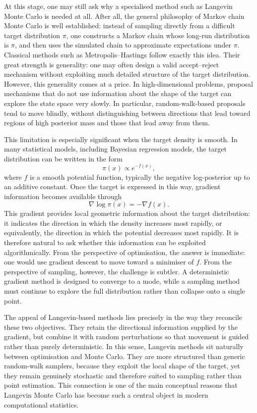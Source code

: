 \documentclass[a4paper,11pt, titlepage]{article}
\theoremstyle{definition}
\theoremstyle{plain}
\theoremstyle{remark}
\begin{document}
At this stage, one may still ask why a specialised method such as Langevin Monte Carlo is needed at all. After all, the general philosophy of Markov chain Monte Carlo is well established: instead of sampling directly from a difficult target distribution $\pi$, one constructs a Markov chain whose long-run distribution is $\pi$, and then uses the simulated chain to approximate expectations under $\pi$. Classical methods such as Metropolis--Hastings follow exactly this idea. Their great strength is generality: one may often design a valid accept--reject mechanism without exploiting much detailed structure of the target distribution. However, this generality comes at a price. In high-dimensional problems, proposal mechanisms that do not use information about the shape of the target can explore the state space very slowly. In particular, random-walk-based proposals tend to move blindly, without distinguishing between directions that lead toward regions of high posterior mass and those that lead away from them.

This limitation is especially significant when the target density is smooth. In many statistical models, including Bayesian regression models, the target distribution can be written in the form
\[
\pi(x) \propto e^{-f(x)},
\]
where $f$ is a smooth potential function, typically the negative log-posterior up to an additive constant. Once the target is expressed in this way, gradient information becomes available through
\[
\nabla \log \pi(x) = -\nabla f(x).
\]
This gradient provides local geometric information about the target distribution: it indicates the direction in which the density increases most rapidly, or equivalently, the direction in which the potential decreases most rapidly. It is therefore natural to ask whether this information can be exploited algorithmically. From the perspective of optimisation, the answer is immediate: one would use gradient descent to move toward a minimiser of $f$. From the perspective of sampling, however, the challenge is subtler. A deterministic gradient method is designed to converge to a mode, while a sampling method must continue to explore the full distribution rather than collapse onto a single point.

The appeal of Langevin-based methods lies precisely in the way they reconcile these two objectives. They retain the directional information supplied by the gradient, but combine it with random perturbations so that movement is guided rather than purely deterministic. In this sense, Langevin methods sit naturally between optimisation and Monte Carlo. They are more structured than generic random-walk samplers, because they exploit the local shape of the target, yet they remain genuinely stochastic and therefore suited to sampling rather than point estimation. This connection is one of the main conceptual reasons that Langevin Monte Carlo has become such a central object in modern computational statistics.
\end{document}
